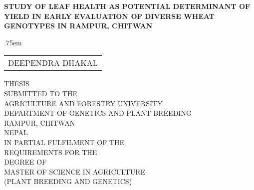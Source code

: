 
{\pagestyle{empty}
  \fontsize{12}{14}\selectfont
  \begin{titlepage}
  \newpage
  \let\footnotesize\small
  \let\footnoterule\relax
  \let \footnote \thanks

  \begin{center}
    \setcounter{page}{1}
    \null
    {\fontsize{12}{14}\selectfont \textbf{STUDY OF LEAF HEALTH AS POTENTIAL DETERMINANT OF YIELD IN EARLY EVALUATION OF DIVERSE WHEAT GENOTYPES IN RAMPUR, CHITWAN}}
    \vspace{8\baselineskip}
    \centerline{}
	{\fontsize{12}{14}\selectfont \lineskip .75em
    \begin{tabular}[t]{c}%
      DEEPENDRA DHAKAL
    \end{tabular}\par}
	\vspace{3\baselineskip}
    THESIS \\
    SUBMITTED TO THE \\
    AGRICULTURE AND FORESTRY UNIVERSITY \\
    DEPARTMENT OF GENETICS AND PLANT BREEDING \\
    RAMPUR, CHITWAN \\
    NEPAL \\
	\vspace{3\baselineskip}
	  IN PARTIAL FULFILMENT OF THE \\
	  REQUIREMENTS FOR THE \\
	  DEGREE OF \\
	\vspace{3\baselineskip}
	  MASTER OF SCIENCE IN AGRICULTURE \\
	  (PLANT BREEDING AND GENETICS) \\
    \centerline{}
    {\fontsize{12}{14} \par}
  \end{center}\par
  \end{titlepage}
}

